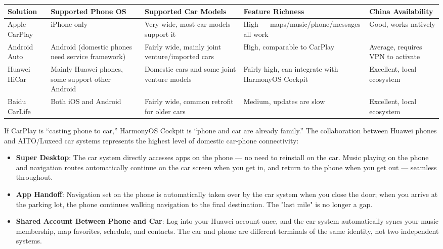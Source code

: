 \begin{center}
\begin{tabularx}{\linewidth}{|X|X|X|X|X|}
\hline
\textbf{Solution} & \textbf{Supported Phone OS} & \textbf{Supported Car Models} & \textbf{Feature Richness} & \textbf{China Availability} \tabularnewline
\hline
Apple CarPlay & iPhone only & Very wide, most car models support it & High — maps/music/phone/messages all work & Good, works natively \tabularnewline
Android Auto & Android (domestic phones need service framework) & Fairly wide, mainly joint venture/imported cars & High, comparable to CarPlay & Average, requires VPN to activate \tabularnewline
Huawei HiCar & Mainly Huawei phones, some support other Android & Domestic cars and some joint venture models & Fairly high, can integrate with HarmonyOS Cockpit & Excellent, local ecosystem \tabularnewline
Baidu CarLife & Both iOS and Android & Fairly wide, common retrofit for older cars & Medium, updates are slow & Excellent, local ecosystem \tabularnewline
\hline
\end{tabularx}
\end{center}


If CarPlay is “casting phone to car,” HarmonyOS Cockpit is “phone and car are already family.” The collaboration between Huawei phones and AITO/Luxeed car systems represents the highest level of domestic car-phone connectivity:

\begin{itemize}
  \item \textbf{Super Desktop}: The car system directly accesses apps on the phone — no need to reinstall on the car. Music playing on the phone and navigation routes automatically continue on the car screen when you get in, and return to the phone when you get out — seamless throughout.
  \item \textbf{App Handoff}: Navigation set on the phone is automatically taken over by the car system when you close the door; when you arrive at the parking lot, the phone continues walking navigation to the final destination. The "last mile" is no longer a gap.
  \item \textbf{Shared Account Between Phone and Car}: Log into your Huawei account once, and the car system automatically syncs your music membership, map favorites, schedule, and contacts. The car and phone are different terminals of the same identity, not two independent systems.
\end{itemize}


